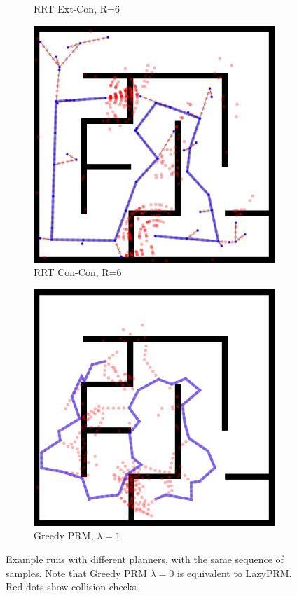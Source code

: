 \documentclass{report}
\begin{document}
\begin{figure}
\begin{subfigure}[b]{0.3\textwidth}
\caption{RRT Ext-Con, R=6}
\end{subfigure}%
\quad
\begin{subfigure}[b]{0.3\textwidth}
\includegraphics[width=\textwidth]{figs/compare-2d-rrtc1-rrtconcon-r6-s1.png}
\caption{RRT Con-Con, R=6}
\end{subfigure}%
\quad
\begin{subfigure}[b]{0.3\textwidth}
\includegraphics[width=\textwidth]{figs/compare-2d-rrtc1-checkmask-l10-s1.png}
\caption{Greedy PRM, $\lambda=1$}
\end{subfigure}%
\caption{Example runs with different planners,
   with the same sequence of samples.
   Note that Greedy PRM $\lambda=0$ is equivalent to LazyPRM.
   Red dots show collision checks.}
\label{fig:compare-2d-rrtc1-vis}
\end{figure}
\end{document}
